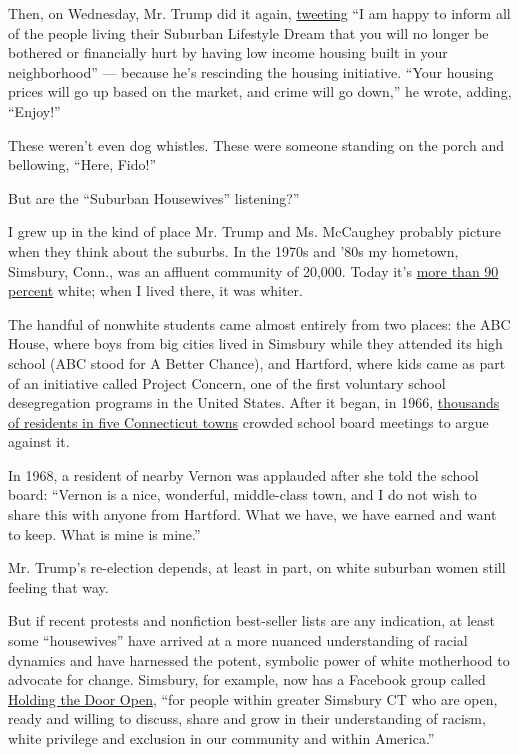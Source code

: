Then, on Wednesday, Mr. Trump did it again,
\href{https://twitter.com/realDonaldTrump/status/1288509568578777088}{tweeting}
``I am happy to inform all of the people living their Suburban Lifestyle
Dream that you will no longer be bothered or financially hurt by having
low income housing built in your neighborhood'' --- because he's
rescinding the housing initiative. ``Your housing prices will go up
based on the market, and crime will go down,'' he wrote, adding,
``Enjoy!''

These weren't even dog whistles. These were someone standing on the
porch and bellowing, ``Here, Fido!''

But are the ``Suburban Housewives'' listening?''

I grew up in the kind of place Mr. Trump and Ms. McCaughey probably
picture when they think about the suburbs. In the 1970s and '80s my
hometown, Simsbury, Conn., was an affluent community of 20,000. Today
it's
\href{https://www.census.gov/quickfacts/simsburytownhartfordcountyconnecticut}{more
than 90 percent} white; when I lived there, it was whiter.

The handful of nonwhite students came almost entirely from two places:
the ABC House, where boys from big cities lived in Simsbury while they
attended its high school (ABC stood for A Better Chance), and Hartford,
where kids came as part of an initiative called Project Concern, one of
the first voluntary school desegregation programs in the United States.
After it began, in 1966,
\href{https://www.courant.com/courant-250/moments-in-history/hc-xpm-2014-06-29-hc-250-project-concern-20140625-story.html\#:~:text=Glastonbury's\%20school\%20board\%20rejected\%20Project\%20Concern.\&text=One\%20Vernon\%20resident\%2C\%20who\%20spoke,this\%20with\%20anyone\%20from\%20Hartford.}{thousands
of residents in five Connecticut towns} crowded school board meetings to
argue against it.

In 1968, a resident of nearby Vernon was applauded after she told the
school board: ``Vernon is a nice, wonderful, middle-class town, and I do
not wish to share this with anyone from Hartford. What we have, we have
earned and want to keep. What is mine is mine.''

Mr. Trump's re-election depends, at least in part, on white suburban
women still feeling that way.

But if recent protests and nonfiction best-seller lists are any
indication, at least some ``housewives'' have arrived at a more nuanced
understanding of racial dynamics and have harnessed the potent, symbolic
power of white motherhood to advocate for change. Simsbury, for example,
now has a Facebook group called
\href{https://www.facebookcorewwwi.onion/groups/holdingthedooropen/?ref=share}{Holding
the Door Open}, ``for people within greater Simsbury CT who are open,
ready and willing to discuss, share and grow in their understanding of
racism, white privilege and exclusion in our community and within
America.''

